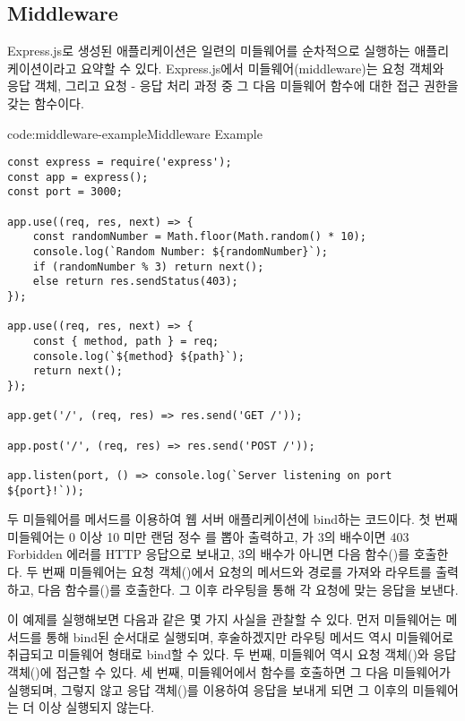 \subsection*{Middleware}

Express.js로 생성된 애플리케이션은 일련의 미들웨어를 순차적으로 실행하는 애플리케이션이라고 요약할 수 있다. Express.js에서 미들웨어(middleware)는 요청 객체와 응답 객체, 그리고 요청 - 응답 처리 과정 중 그 다음 미들웨어 함수에 대한 접근 권한을 갖는 함수이다.

\begin{codeenv}{code:middleware-example}{Middleware Example}\begin{verbatim}
const express = require('express');
const app = express();
const port = 3000;

app.use((req, res, next) => {
    const randomNumber = Math.floor(Math.random() * 10);
    console.log(`Random Number: ${randomNumber}`);
    if (randomNumber % 3) return next();
    else return res.sendStatus(403);
});

app.use((req, res, next) => {
    const { method, path } = req;
    console.log(`${method} ${path}`);
    return next();
});

app.get('/', (req, res) => res.send('GET /'));

app.post('/', (req, res) => res.send('POST /'));

app.listen(port, () => console.log(`Server listening on port ${port}!`));
\end{verbatim}
\end{codeenv}

\은 두 미들웨어를  메서드를 이용하여 웹 서버 애플리케이션에 bind하는 코드이다. 첫 번째 미들웨어는 0 이상 10 미만 랜덤 정수 를 뽑아 출력하고, 가 3의 배수이면 403 Forbidden 에러를 HTTP 응답으로 보내고, 3의 배수가 아니면 다음 함수()를 호출한다. 두 번째 미들웨어는 요청 객체()에서 요청의 메서드와 경로를 가져와 라우트를 출력하고, 다음 함수를()를 호출한다. 그 이후 라우팅을 통해 각 요청에 맞는 응답을 보낸다.

이 예제를 실행해보면 다음과 같은 몇 가지 사실을 관찰할 수 있다. 먼저 미들웨어는  메서드를 통해 bind된 순서대로 실행되며, 후술하겠지만 라우팅 메서드 역시 미들웨어로 취급되고 미들웨어 형태로 bind할 수 있다. 두 번째, 미들웨어 역시 요청 객체()와 응답 객체()에 접근할 수 있다. 세 번째, 미들웨어에서  함수를 호출하면 그 다음 미들웨어가 실행되며, 그렇지 않고 응답 객체()를 이용하여 응답을 보내게 되면 그 이후의 미들웨어는 더 이상 실행되지 않는다.

